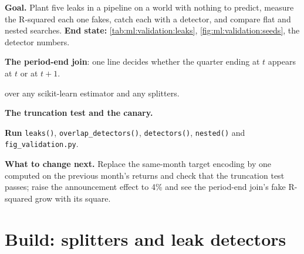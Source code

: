 \begin{tutorial}
\textbf{Goal.} Plant five leaks in a pipeline on a world with nothing to predict, measure the R-squared each one fakes,
catch each with a detector, and compare flat and nested searches. \textbf{End state:} \cref{tab:ml:validation:leaks},
\cref{fig:ml:validation:seeds}, the detector numbers.
\begin{tutsteps}
\item \textbf{The period-end join}: one line decides whether the quarter ending at $t$ appears at $t$ or at $t+1$.
\label{lst:ml:validation:join}
\item \textbf{} over any scikit-learn estimator and any splitters.
\label{lst:ml:validation:nested}
\item \textbf{The truncation test and the canary.}
\label{lst:ml:validation:detectors}
\item \textbf{Run} \texttt{leaks()}, \texttt{overlap\_detectors()}, \texttt{detectors()}, \texttt{nested()} and
\texttt{fig\_validation.py}.
\end{tutsteps}
\textbf{What to change next.} Replace the same-month target encoding by one computed on the previous month's returns and
check that the truncation test passes; raise the announcement effect to 4\% and see the period-end join's fake R-squared
grow with its square.
\end{tutorial}

\section{Build: splitters and leak detectors}\label{bld:ml:validation:cvsplit}

